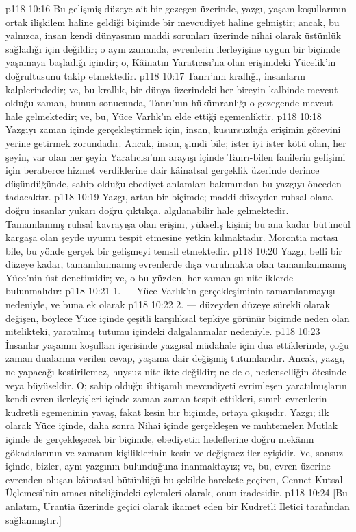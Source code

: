 \vs p118 10:16 Bu gelişmiş düzeye ait bir gezegen üzerinde, yazgı, yaşam koşullarının ortak ilişkilem haline geldiği biçimde bir mevcudiyet haline gelmiştir; ancak, bu yalnızca, insan kendi dünyasının maddi sorunları üzerinde nihai olarak üstünlük sağladığı için değildir; o aynı zamanda, evrenlerin ilerleyişine uygun bir biçimde yaşamaya başladığı içindir; o, Kâinatın Yaratıcısı’na olan erişimdeki Yücelik’in doğrultusunu takip etmektedir.
\vs p118 10:17 Tanrı’nın krallığı, insanların kalplerindedir; ve, bu krallık, bir dünya üzerindeki her bireyin kalbinde mevcut olduğu zaman, bunun sonucunda, Tanrı’nın hükümranlığı o gezegende mevcut hale gelmektedir; ve, bu, Yüce Varlık’ın elde ettiği egemenliktir.
\vs p118 10:18 Yazgıyı zaman içinde gerçekleştirmek için, insan, kusursuzluğa erişimin görevini yerine getirmek zorundadır. Ancak, insan, şimdi bile; ister iyi ister kötü olan, her şeyin, var olan her şeyin Yaratıcısı’nın arayışı içinde Tanrı\hyp{}bilen fanilerin gelişimi için beraberce hizmet verdiklerine dair kâinatsal gerçeklik üzerinde derince düşündüğünde, sahip olduğu ebediyet anlamları bakımından bu yazgıyı önceden tadacaktır.
\vs p118 10:19 Yazgı, artan bir biçimde; maddi düzeyden ruhsal olana doğru insanlar yukarı doğru çıktıkça, algılanabilir hale gelmektedir. Tamamlanmış ruhsal kavrayışa olan erişim, yükseliş kişini; bu ana kadar bütüncül kargaşa olan şeyde uyumu tespit etmesine yetkin kılmaktadır. Morontia motası bile, bu yönde gerçek bir gelişmeyi temsil etmektedir.
\vs p118 10:20 Yazgı, belli bir düzeye kadar, tamamlanmamış evrenlerde dışa vurulmakta olan tamamlanmamış Yüce’nin üst\hyp{}denetimidir; ve, o bu yüzden, her zaman şu niteliklerde bulunmalıdır:
\vs p118 10:21 1.\bibnobreakspace {} --- Yüce Varlık’ın gerçekleşiminin tamamlanmayışı nedeniyle, ve buna ek olarak
\vs p118 10:22 2.\bibnobreakspace {} --- düzeyden düzeye sürekli olarak değişen, böylece Yüce içinde çeşitli karşılıksal tepkiye görünür biçimde neden olan nitelikteki, yaratılmış tutumu içindeki dalgalanmalar nedeniyle.
\vs p118 10:23 İnsanlar yaşamın koşulları içerisinde yazgısal müdahale için dua ettiklerinde, çoğu zaman dualarına verilen cevap, yaşama dair değişmiş tutumlarıdır. Ancak, yazgı, ne yapacağı kestirilemez, huysuz nitelikte değildir; ne de o, nedenselliğin ötesinde veya büyüseldir. O; sahip olduğu ihtişamlı mevcudiyeti evrimleşen yaratılmışların kendi evren ilerleyişleri içinde zaman zaman tespit ettikleri, sınırlı evrenlerin kudretli egemeninin yavaş, fakat kesin bir biçimde, ortaya çıkışıdır. Yazgı; ilk olarak Yüce içinde, daha sonra Nihai içinde gerçekleşen ve muhtemelen Mutlak içinde de gerçekleşecek bir biçimde, ebediyetin hedeflerine doğru mekânın gökadalarının ve zamanın kişiliklerinin kesin ve değişmez ilerleyişidir. Ve, sonsuz içinde, bizler, aynı yazgının bulunduğuna inanmaktayız; ve, bu, evren üzerine evrenden oluşan kâinatsal bütünlüğü bu şekilde harekete geçiren, Cennet Kutsal Üçlemesi’nin amacı niteliğindeki eylemleri olarak, onun iradesidir.
\vs p118 10:24 [Bu anlatım, Urantia üzerinde geçici olarak ikamet eden bir Kudretli İletici tarafından sağlanmıştır.]
